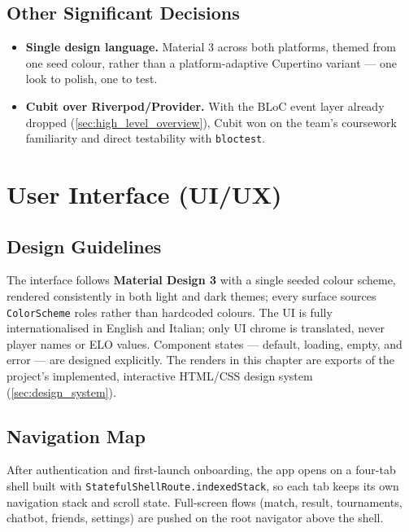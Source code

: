 \documentclass{configurations/polimi3i_thesis}
\renewcommand{\_}{\textunderscore\allowbreak}
\begin{document}
\section{Other Significant Decisions}
\begin{itemize}
    \item \textbf{Single design language.} Material 3 across both platforms, themed from one seed colour, rather than a platform-adaptive Cupertino variant — one look to polish, one to test.
    \item \textbf{Cubit over Riverpod/Provider.} With the BLoC event layer already dropped (\cref{sec:high_level_overview}), Cubit won on the team's coursework familiarity and direct testability with \texttt{bloc\_test}.
\end{itemize}


\chapter{User Interface (UI/UX)}
\label{ch:user_interface}

\section{Design Guidelines}
The interface follows \textbf{Material Design 3} with a single seeded colour scheme, rendered consistently in both light and dark themes; every surface sources \texttt{ColorScheme} roles rather than hardcoded colours. The UI is fully internationalised in English and Italian; only UI chrome is translated, never player names or ELO values. Component states — default, loading, empty, and error — are designed explicitly. The renders in this chapter are exports of the project's implemented, interactive HTML/CSS design system (\cref{sec:design_system}).

\section{Navigation Map}
After authentication and first-launch onboarding, the app opens on a four-tab shell built with \texttt{StatefulShellRoute.indexedStack}, so each tab keeps its own navigation stack and scroll state. Full-screen flows (match, result, tournaments, chatbot, friends, settings) are pushed on the root navigator above the shell.
\end{document}

